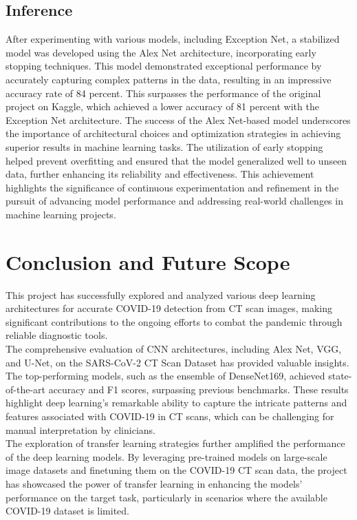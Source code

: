 \documentclass[12pt, a4paper]{report}
\begin{document}
\vspace{10cm}

\section{Inference}
After experimenting with various models, including Exception Net, a stabilized model was developed using the Alex Net architecture, incorporating early stopping techniques. This model demonstrated exceptional performance by accurately capturing complex patterns in the data, resulting in an impressive accuracy rate of 84 percent. This surpasses the performance of the original project on Kaggle, which achieved a lower accuracy of 81 percent with the
Exception Net architecture. The success of the Alex Net-based model underscores the importance of architectural choices and optimization strategies in achieving superior results in machine learning tasks. The utilization of early stopping helped prevent overfitting and ensured that the model generalized well to unseen data, further enhancing its reliability and
effectiveness. This achievement highlights the significance of continuous experimentation and refinement in the pursuit of advancing model performance and addressing real-world challenges in machine learning projects.

\chapter{Conclusion and Future Scope}
This project has successfully explored and analyzed various deep learning architectures for accurate COVID-19 detection from CT scan images, making significant contributions to the ongoing efforts to combat the pandemic through reliable diagnostic tools.\\

The comprehensive evaluation of CNN architectures, including Alex Net, VGG, and U-Net, on the SARS-CoV-2 CT Scan Dataset has provided valuable insights. The top-performing models, such as the ensemble of DenseNet169, achieved state-of-the-art accuracy and F1 scores, surpassing previous benchmarks. These results highlight deep learning's remarkable ability to capture the intricate patterns and features associated with COVID-19 in CT scans,
which can be challenging for manual interpretation by clinicians.\\

The exploration of transfer learning strategies further amplified the performance of the deep learning models. By leveraging pre-trained models on large-scale image datasets and finetuning them on the COVID-19 CT scan data, the project has showcased the power of transfer learning in enhancing the models' performance on the target task, particularly in scenarios where the available COVID-19 dataset is limited.\\
\end{document}

